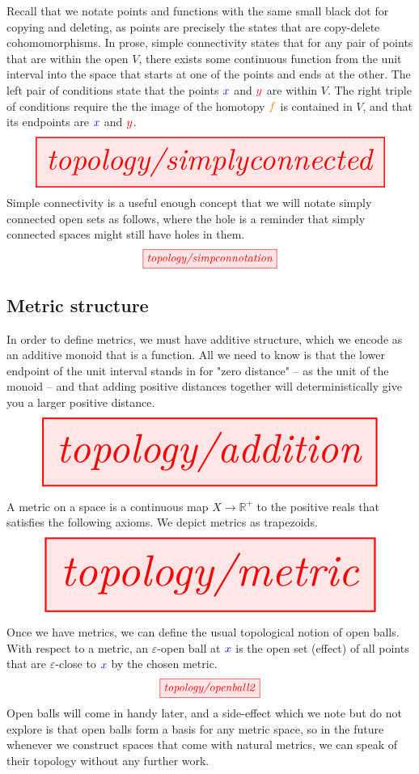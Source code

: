 \clearpage

\begin{example}\label{def:simpconn}
Recall that we notate points and functions with the same small black dot for copying and deleting, as points are precisely the states that are copy-delete cohomomorphisms. In prose, simple connectivity states that for any pair of points that are within the open $V$, there exists some continuous function from the unit interval into the space that starts at one of the points and ends at the other. The left pair of conditions state that the points $\textcolor{blue}{x}$ and $\textcolor{red}{y}$ are within $V$. The right triple of conditions require the the image of the homotopy $\textcolor{orange}{f}$ is contained in $V$, and that its endpoints are $\textcolor{blue}{x}$ and $\textcolor{red}{y}$.
\[\resizebox{\textwidth}{!}{\tikzfig{topology/simplyconnected}}\]
Simple connectivity is a useful enough concept that we will notate simply connected open sets as follows, where the hole is a reminder that simply connected spaces might still have holes in them.
\[\tikzfig{topology/simpconnotation}\]
\end{example}

\clearpage

\subsection{Metric structure}

\begin{defn}[Addition]\label{def:addition}
In order to define metrics, we must have additive structure, which we encode as an additive monoid that is a function. All we need to know is that the lower endpoint of the unit interval stands in for "zero distance" -- as the unit of the monoid -- and that adding positive distances together will deterministically give you a larger positive distance.
\[\resizebox{\textwidth}{!}{\tikzfig{topology/addition}}\]
\end{defn}

\begin{defn}[Metric]\label{def:metric}
A metric on a space is a continuous map $X \rightarrow \mathbb{R}^+$ to the positive reals that satisfies the following axioms. We depict metrics as trapezoids.
\[\resizebox{\textwidth}{!}{\tikzfig{topology/metric}}\]
\end{defn}

\clearpage

\begin{example}\label{def:openball}
Once we have metrics, we can define the usual topological notion of open balls. With respect to a metric, an $\varepsilon$-open ball at $\textcolor{blue}{x}$ is the open set (effect) of all points that are $\varepsilon$-close to $\textcolor{blue}{x}$ by the chosen metric.
\[\tikzfig{topology/openball2}\]
Open balls will come in handy later, and a side-effect which we note but do not explore is that open balls form a basis for any metric space, so in the future whenever we construct spaces that come with natural metrics, we can speak of their topology without any further work.
\end{example}

